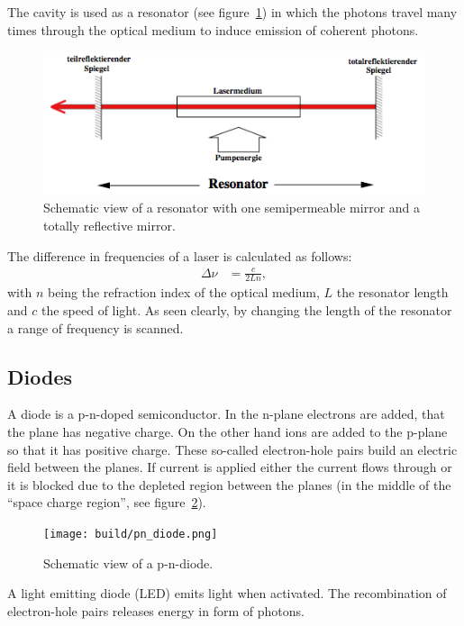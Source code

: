 The cavity is used as a resonator (see figure~\ref{fig:resonator}) in which the photons
travel many times through the optical medium to induce emission of coherent photons.

\begin{figure}[ht]
  \centering
  \includegraphics[width=0.8\linewidth]{content/resonator.png}
  \caption{Schematic view of a resonator with one semipermeable mirror and a totally reflective
  mirror\cite{anleitung_hene}.}%
  \label{fig:resonator}
\end{figure}

The difference in frequencies of a laser is calculated as follows:
\begin{align}\label{eq:free_spectral_range}
  \Delta \nu &= \frac{c}{2Ln},
\end{align}
with $n$ being the refraction index of the optical medium, $L$ the resonator length
and $c$ the speed of light.
As seen clearly, by changing the length of the resonator a range of frequency is scanned.


\subsection{Diodes}\label{diodes}

A diode is a p-n-doped semiconductor.
In the n-plane electrons are added, that the plane has negative charge.
On the other hand ions are added to the p-plane so that it has positive charge.
These so-called electron-hole pairs build an electric field between the planes.
If current is applied either the current flows through or it is blocked due to the depleted region
between the planes (in the middle of the \enquote{space charge region},
see figure~\ref{fig:depletion_region}).
\begin{figure}[ht]
  \centering
  \texttt{[image: build/pn\_diode.png]}
  \caption{Schematic view of a p-n-diode\cite{pn_diode_wiki}.}%
  \label{fig:depletion_region}
\end{figure}

A light emitting diode (LED) emits light when activated.
The recombination of electron-hole pairs releases energy in form of photons.

